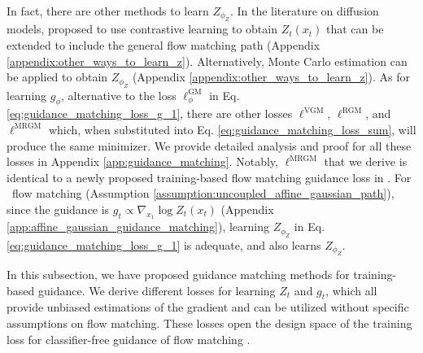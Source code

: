 In fact, there are other methods to learn $Z_{\phi_Z}$. In the literature on diffusion models, \citet{lu_contrastive_nodate} proposed to use contrastive learning to obtain $Z_t(x_t)$ that can be extended to include the general flow matching path (Appendix \ref{appendix:other_ways_to_learn_z}). Alternatively, Monte Carlo estimation can be applied to obtain $Z_{\phi_Z}$ (Appendix \ref{appendix:other_ways_to_learn_z}).
As for learning $g_\phi$,
alternative to the loss $\ell_{\phi}^{\text{GM}}$ in Eq. \eqref{eq:guidance_matching_loss_g_1}, 
there are other losses $\ell^{\text{VGM}}$, $\ell^{\text{RGM}}$, and $\ell^{\text{MRGM}}$ which, when substituted into Eq. \eqref{eq:guidance_matching_loss_sum}, will produce the same minimizer. We provide detailed analysis and proof for all these losses in Appendix \ref{app:guidance_matching}.
Notably, $\ell^{\text{MRGM}}$ that we derive is identical to a newly proposed training-based flow matching guidance loss in \citet{anonymous2025energyweighted}. For \diffusionpath~flow matching (Assumption \ref{assumption:uncoupled_affine_gaussian_path}), since the guidance is $g_t\propto\nabla_{x_1}\log Z_t(x_t)$ (Appendix \ref{app:affine_gaussian_guidance_matching}), learning $Z_{\phi_Z}$ in Eq. \eqref{eq:guidance_matching_loss_g_1} is adequate, and \citet{lu_contrastive_nodate} also learns $Z_{\phi_Z}$.





In this subsection, we have proposed guidance matching methods for training-based guidance. We derive different losses for learning $Z_t$ and $g_t$, which all provide unbiased estimations of the gradient and can be utilized without specific assumptions on flow matching. 
These losses open the design space of the training loss for classifier-free guidance of flow matching \citep{ho_classifier-free_2022,zhang_adding_2023}.




